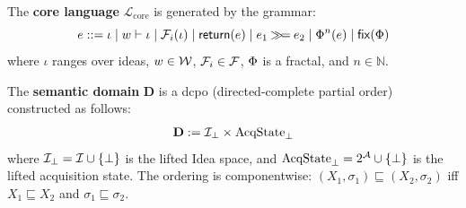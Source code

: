 \begin{definition}
\label{def:core-lang-syntax}
The \textbf{core language} $\mathcal{L}_{\mathrm{core}}$ is generated by the grammar:
\[
e ::= \iota \mid w \vdash \iota \mid \mathcal{F}_i(\iota) \mid \mathsf{return}(e) \mid
      e_1 \mathbin{\gg\!=} e_2 \mid \Phi^n(e) \mid \mathsf{fix}(\Phi)
\]
where $\iota$ ranges over ideas, $w \in \mathcal{W}$, $\mathcal{F}_i \in \mathcal{F}$,
$\Phi$ is a fractal, and $n \in \mathbb{N}$.
\end{definition}

\begin{definition}
\label{def:semantic-domain}
The \textbf{semantic domain} $\mathbf{D}$ is a dcpo (directed-complete partial order)
constructed as follows:
\[
\mathbf{D} := \mathcal{I}_\bot \times \mathrm{AcqState}_\bot
\]
where $\mathcal{I}_\bot = \mathcal{I} \cup \{\bot\}$ is the lifted Idea space, and
$\mathrm{AcqState}_\bot = 2^{\mathcal{A}} \cup \{\bot\}$ is the lifted acquisition state.
The ordering is componentwise: $(X_1, \sigma_1) \sqsubseteq (X_2, \sigma_2)$ iff
$X_1 \sqsubseteq X_2$ and $\sigma_1 \sqsubseteq \sigma_2$.
\end{definition}

